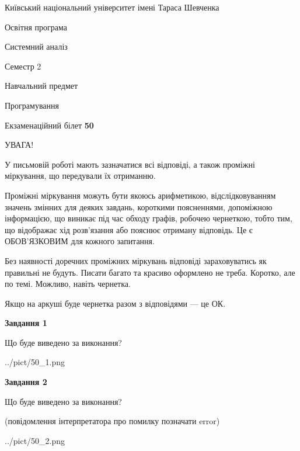 \documentclass[12pt, ukrainian]{article}
\begin{document}
{{\begin {small}\par
{ \center  Київський національний університет імені Тараса Шевченка \par}
{\parbox {5 cm}{Освітня програма \hfill}{\parbox {7 cm}{Системний аналіз \hfill}}\parbox {6 cm}{\hfill Семестр 2}}\par
{\parbox {5 cm} {Навчальний предмет \hfill}\parbox {7 cm}{Програмування \hfill}\parbox {6cm}{\hfill}\par}\vspace{-7pt} \end{small}}{\center Екзаменаційний білет \No \textbf
{ 50 }\par}}
{
\begin {large}
УВАГА!

У письмовій роботі мають зазначатися всі відповіді, а також проміжні міркування, що передували їх отриманню.

Проміжні міркування можуть бути якоюсь арифметикою, відслідковуванням зна\-чень змінних для деяких завдань,
короткими поясненнями, допоміжною інформацією, що виникає під час обходу графів, робочею чернеткою,
тобто тим, що відображає хід розв’язання або пояснює отриману відповідь.
Це є ОБОВ’ЯЗКОВИМ для кожного запитання.

Без наявності доречних проміжних міркувань відповіді зараховуватись як правиль\-ні не будуть.
Писати багато та красиво оформлено не треба. Коротко, але по темі. Можли\-во, навіть чернетка.

Якщо на аркуші буде чернетка разом з відповідями --- це ОК.

\newpage

{\begin {center}\textbf{Завдання 1}\end {center}}\par
Що буде виведено за виконання?\par
\begin{center}
	{../pict/50_1.png}
\end{center}
\newpage

{\begin {center}\textbf{Завдання 2}\end {center}}\par
Що буде виведено за виконання?\par
 (повідомлення інтерпретатора про помилку позначати error)\par
\begin{center}
	{../pict/50_2.png}
\end{center}
\newpage


\end{large}}
\end{document}
